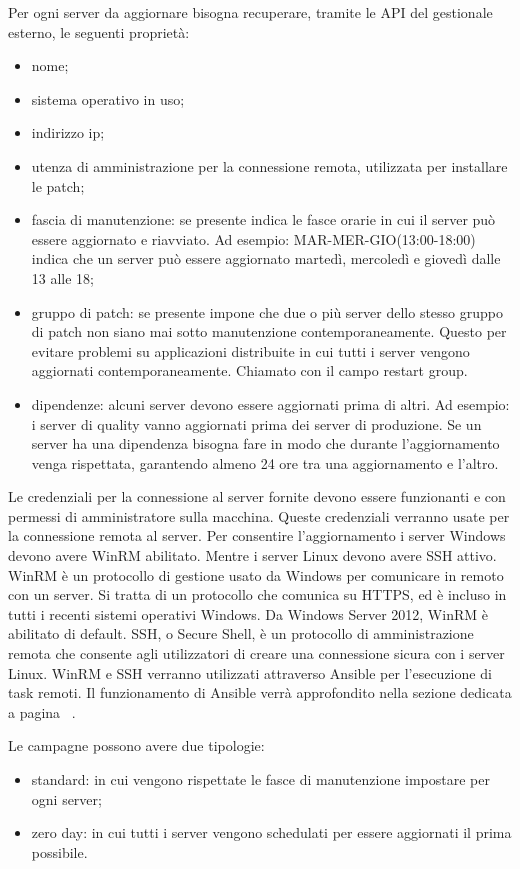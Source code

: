 \noindent Per ogni server da aggiornare bisogna recuperare, tramite le API del gestionale 
esterno, le seguenti proprietà:
\begin{itemize}
\item nome;
\item sistema operativo in uso;
\item indirizzo ip;
\item utenza di amministrazione per la connessione remota, utilizzata per 
installare le patch;
\item fascia di manutenzione: se presente indica le fasce orarie in cui il
server può essere aggiornato e riavviato. Ad esempio: MAR-MER-GIO(13:00-18:00)
indica che un server può essere aggiornato martedì, mercoledì e 
giovedì dalle 13 alle 18;
\item gruppo di patch: se presente impone che due o più server dello
stesso gruppo di patch non siano mai sotto manutenzione contemporaneamente. 
Questo per evitare problemi su applicazioni distribuite in cui tutti i server 
vengono aggiornati contemporaneamente. Chiamato con il campo restart group.
\item dipendenze: alcuni server devono essere aggiornati prima di altri. 
Ad esempio: i server di quality vanno aggiornati prima dei server di produzione.
Se un server ha una dipendenza bisogna fare in modo che durante l’aggiornamento
venga rispettata, garantendo almeno 24 ore tra una aggiornamento e l'altro.
\end{itemize}
Le credenziali per la connessione al server fornite devono essere funzionanti e con 
permessi di amministratore sulla macchina. Queste credenziali verranno usate
per la connessione remota al server.
Per consentire l’aggiornamento i server Windows devono avere WinRM abilitato.
Mentre i server Linux devono avere SSH attivo. WinRM è un protocollo di 
gestione usato da Windows per comunicare in remoto con un server. 
Si tratta di un protocollo che comunica su HTTPS, ed è incluso in tutti 
i recenti sistemi operativi Windows. Da Windows Server 2012, WinRM è 
abilitato di default. 
SSH, o Secure Shell, è un protocollo di amministrazione remota che consente 
agli utilizzatori di creare una connessione sicura con i server Linux.
WinRM e SSH verranno utilizzati attraverso Ansible per l’esecuzione di task
remoti. Il funzionamento di Ansible verrà approfondito nella sezione dedicata a 
pagina ~\pageref{subsec:Ansible}.

\noindent Le campagne possono avere due tipologie:
\begin{itemize}
\item standard: in cui vengono rispettate le fasce di manutenzione impostare 
per ogni server;
\item zero day: in cui tutti i server vengono schedulati per essere 
aggiornati il prima possibile.
\end{itemize}


